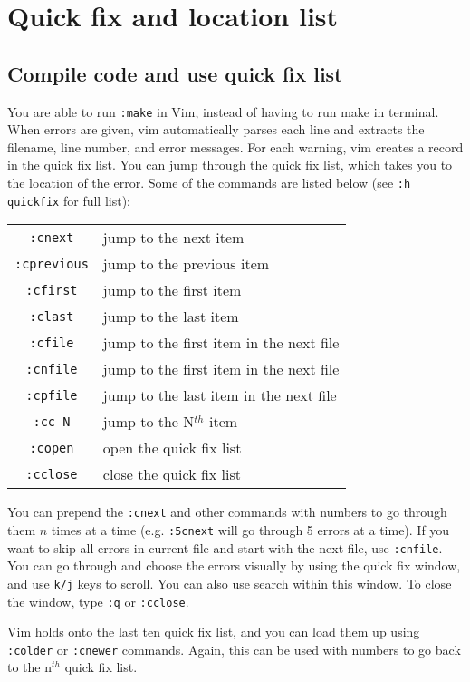 \chapter{Quick fix and location list}

\section{Compile code and use quick fix list}

You are able to run \verb|:make| in Vim, instead of having to run make in terminal.
When errors are given, vim automatically parses each line and extracts the filename, line number, and error messages.
For each warning, vim creates a record in the quick fix list.
You can jump through the quick fix list, which takes you to the location of the error.
Some of the commands are listed below (see \verb|:h quickfix| for full list):\\

\begin{tabular}{c|l}
    \verb|:cnext|     & jump to the next item\\
    \verb|:cprevious| & jump to the previous item\\
    \verb|:cfirst|    & jump to the first item\\
    \verb|:clast|     & jump to the last item\\
    \verb|:cfile|     & jump to the first item in the next file\\
    \verb|:cnfile|    & jump to the first item in the next file\\
    \verb|:cpfile|    & jump to the last item in the next file\\
    \verb|:cc N|      & jump to the N$^{th}$ item\\
    \verb|:copen|     & open the quick fix list\\
    \verb|:cclose|    & close the quick fix list\\
\end{tabular}
\newline

You can prepend the \verb|:cnext| and other commands with numbers to go through them $n$ times at a time (e.g. \verb|:5cnext| will go through 5 errors at a time).
If you want to skip all errors in current file and start with the next file, use \verb|:cnfile|.
You can go through and choose the errors visually by using the quick fix window, and use \verb|k/j| keys to scroll.
You can also use search within this window.
To close the window, type \verb|:q| or \verb|:cclose|.

Vim holds onto the last ten quick  fix list,  and you can load them up using \verb|:colder| or \verb|:cnewer| commands.
Again, this can be used with numbers to go back to the n$^{th}$ quick fix list.
